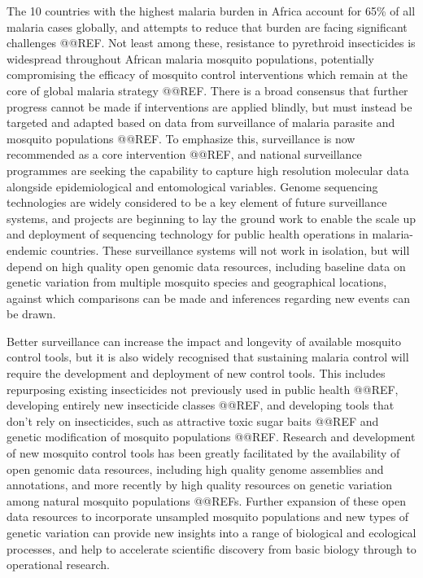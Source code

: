 \documentclass[a4paper,11pt,abstracton,hidelinks]{scrartcl}
\begin{document}
%
The 10 countries with the highest malaria burden in Africa account for 65\% of all malaria cases globally, and attempts to reduce that burden are facing significant challenges @@REF.
%
Not least among these, resistance to pyrethroid insecticides is widespread throughout African malaria mosquito populations, potentially compromising the efficacy of mosquito control interventions which remain at the core of global malaria strategy @@REF.
%
There is a broad consensus that further progress cannot be made if interventions are applied blindly, but must instead be targeted and adapted based on data from surveillance of malaria parasite and mosquito populations @@REF.
%
To emphasize this, surveillance is now recommended as a core intervention @@REF, and national surveillance programmes are seeking the capability to capture high resolution molecular data alongside epidemiological and entomological variables.
%
Genome sequencing technologies are widely considered to be a key element of future surveillance systems, and projects are beginning to lay the ground work to enable the scale up and deployment of sequencing technology for public health operations in malaria-endemic countries.
%
These surveillance systems will not work in isolation, but will depend on high quality open genomic data resources, including baseline data on genetic variation from multiple mosquito species and geographical locations, against which comparisons can be made and inferences regarding new events can be drawn.

%
Better surveillance can increase the impact and longevity of available mosquito control tools, but it is also widely recognised that sustaining malaria control will require the development and deployment of new control tools.
%
This includes repurposing existing insecticides not previously used in public health @@REF, developing entirely new insecticide classes @@REF, and developing tools that don't rely on insecticides, such as attractive toxic sugar baits @@REF and genetic modification of mosquito populations @@REF.
%
Research and development of new mosquito control tools has been greatly facilitated by the availability of open genomic data resources, including high quality genome assemblies and annotations, and more recently by high quality resources on genetic variation among natural mosquito populations @@REFs. 
%
Further expansion of these open data resources to incorporate unsampled mosquito populations and new types of genetic variation can provide new insights into a range of biological and ecological processes, and help to accelerate scientific discovery from basic biology through to operational research.
\end{document}
